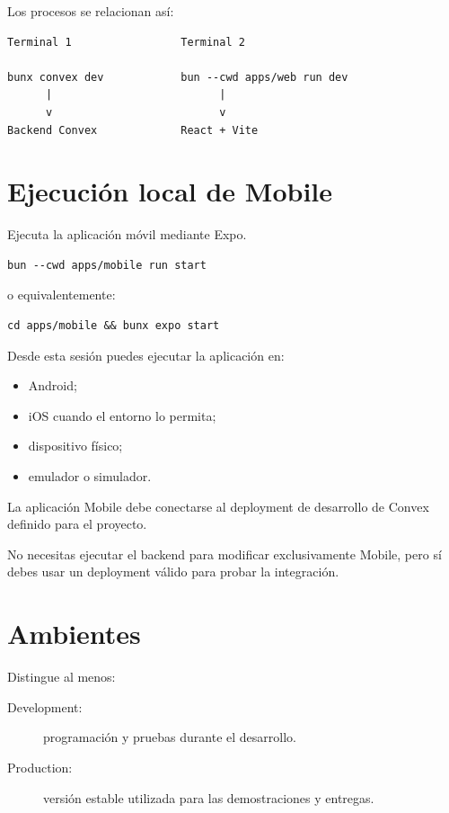 \documentclass[11pt,a4paper]{article}
\begin{document}
Los procesos se relacionan así:

\begin{lstlisting}
Terminal 1                 Terminal 2

bunx convex dev            bun --cwd apps/web run dev
      |                          |
      v                          v
Backend Convex             React + Vite
\end{lstlisting}

\section{Ejecución local de Mobile}

Ejecuta la aplicación móvil mediante Expo.

\begin{lstlisting}
bun --cwd apps/mobile run start
\end{lstlisting}

o equivalentemente:

\begin{lstlisting}
cd apps/mobile && bunx expo start
\end{lstlisting}

Desde esta sesión puedes ejecutar la aplicación en:

\begin{itemize}
  \item Android;
  \item iOS cuando el entorno lo permita;
  \item dispositivo físico;
  \item emulador o simulador.
\end{itemize}

La aplicación Mobile debe conectarse al deployment de desarrollo de Convex
definido para el proyecto.

No necesitas ejecutar el backend para modificar exclusivamente Mobile, pero sí
debes usar un deployment válido para probar la integración.

\section{Ambientes}

Distingue al menos:

\begin{description}
  \item[Development:] programación y pruebas durante el desarrollo.
  \item[Production:] versión estable utilizada para las demostraciones y
    entregas.
\end{description}
\end{document}
